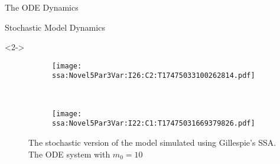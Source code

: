 \documentclass[aspectratio=169, onlytextwidth,  notheorems, sOuRcEs, fleqn, leqno, ]{RUCPresentation}
\begin{document}
\begin{frame}{The ODE Dynamics}
\end{frame}

\begin{frame}{ Stochastic Model Dynamics }

    \begin{onlyenv}<2->
        \begin{figure}[htbp]
            \centering
            \begin{subfigure}{0.5\framewidth}
                \centering
                \texttt{[image: ssa:Novel5Par3Var:I26:C2:T17475033100262814.pdf]}
            \end{subfigure}~
            \begin{subfigure}{0.5\framewidth}
                \centering
                \texttt{[image: ssa:Novel5Par3Var:I22:C1:T17475031669379826.pdf]}
            \end{subfigure}
            \caption{
                The stochastic version of the model simulated using
                Gillespie's SSA.
                The ODE system with \(m_0 = 10\)
            }
        \end{figure}
    \end{onlyenv}

\end{frame}
\end{document}
